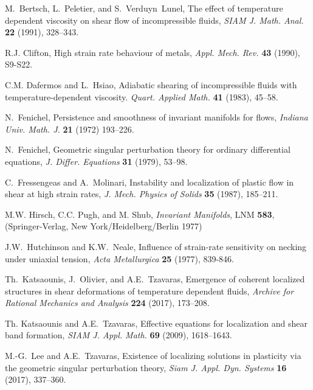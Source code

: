 \documentclass[a4paper,11pt]{article}
\theoremstyle{remark}
\begin{document}
\begin{thebibliography}{10}

{\sc M.~Bertsch, L.~Peletier, and S.~Verduyn~Lunel},
The effect of temperature dependent viscosity on shear flow of  incompressible fluids,
{\it SIAM J. Math. Anal.} {\bf 22 } (1991), 328--343.

{\sc R.J. Clifton},  High strain rate behaviour of metals,
{\it Appl. Mech. Rev.}
{\bf 43} (1990), S9-S22.

{\sc C.M. Dafermos and L.~Hsiao},
Adiabatic shearing of incompressible fluids with temperature-dependent viscosity.
{\it Quart.  Applied Math.} {\bf 41} (1983), 45--58.

{\sc N.~Fenichel},
Persistence and smoothness of invariant manifolds for  flows,
{\it Indiana Univ. Math. J.} {\bf 21} (1972) 193--226.

{\sc N.~Fenichel},
Geometric singular perturbation theory for ordinary differential equations,
{\it J. Differ. Equations} {\bf 31} (1979), 53--98.

{\sc C.~Fressengeas and A.~Molinari},
Instability and localization of plastic flow in shear at high strain rates,
{\it J.  Mech. Physics of Solids} {\bf 35} (1987), 185--211.

{\sc M.W. Hirsch, C.C. Pugh, and M. Shub},
{\it Invariant Manifolds}, LNM {\bf 583}, (Springer-Verlag, New York/Heidelberg/Berlin 1977)

{\sc J.W.~Hutchinson and K.W.~Neale},
Influence of strain-rate sensitivity on necking under uniaxial tension,
{\it  Acta Metallurgica} {\bf 25} (1977), 839-846.

{\sc Th.~Katsaounis, J.~Olivier, and A.E.~Tzavaras},
Emergence of coherent localized structures in shear deformations of temperature dependent fluids,
{\it Archive for Rational Mechanics and Analysis} {\bf 224} (2017), 173--208.

{\sc Th. Katsaounis and A.E.~Tzavaras},
Effective equations for localization and shear band formation,
{\it SIAM J. Appl. Math.}  {\bf 69} (2009), 1618--1643.

{\sc M.-G.~Lee and A.E.~Tzavaras},
Existence of localizing solutions in plasticity via the geometric singular perturbation theory,
{\it Siam J. Appl. Dyn. Systems} {\bf 16} (2017), 337--360.


\end{thebibliography}
\end{document}
